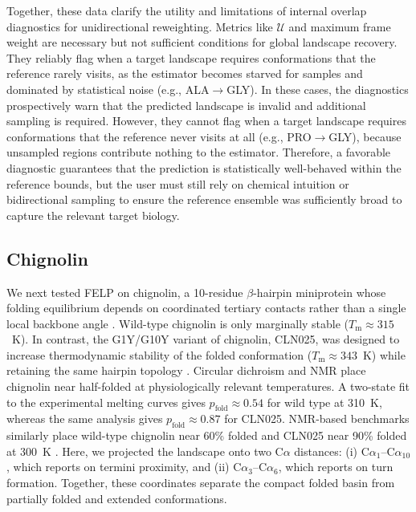 \documentclass[journal=jctcce,manuscript=article,layout=twocolumn,hyperref=true]{achemso}
\begin{document}
	Together, these data clarify the utility and limitations of internal overlap diagnostics for unidirectional reweighting. Metrics like $\mathcal{U}$ and maximum frame weight are necessary but not sufficient conditions for global landscape recovery. They reliably flag when a target landscape requires conformations that the reference rarely visits, as the estimator becomes starved for samples and dominated by statistical noise (e.g., ALA$\rightarrow$GLY). In these cases, the diagnostics prospectively warn that the predicted landscape is invalid and additional sampling is required. However, they cannot flag when a target landscape requires conformations that the reference never visits at all (e.g., PRO$\rightarrow$GLY), because unsampled regions contribute nothing to the estimator. Therefore, a favorable diagnostic guarantees that the prediction is statistically well-behaved within the reference bounds, but the user must still rely on chemical intuition or bidirectional sampling to ensure the reference ensemble was sufficiently broad to capture the relevant target biology. 
	
	\subsection{Chignolin}
	
	We next tested FELP on chignolin, a 10-residue $\beta$-hairpin miniprotein whose folding equilibrium depends on coordinated tertiary contacts rather than a single local backbone angle \cite{honda2004structure}. Wild-type chignolin is only marginally stable ($T_{\mathrm{m}}\approx315$~K). In contrast, the G1Y/G10Y variant of chignolin, CLN025, was designed to increase thermodynamic stability of the folded conformation ($T_{\mathrm{m}}\approx343$~K) while retaining the same hairpin topology \cite{honda2008jacs}. Circular dichroism and NMR place chignolin near half-folded at physiologically relevant temperatures. A two-state fit to the experimental melting curves gives $p_{\mathrm{fold}}\approx0.54$ for wild type at 310~K, whereas the same analysis gives $p_{\mathrm{fold}}\approx0.87$ for CLN025. NMR-based benchmarks similarly place wild-type chignolin near 60\% folded and CLN025 near 90\% folded at 300~K \cite{honda2004structure,honda2008jacs,fischer2024jctc}. Here, we projected the landscape onto two C$\alpha$ distances: (i) C$\alpha_1$--C$\alpha_{10}$, which reports on termini proximity, and (ii) C$\alpha_3$--C$\alpha_6$, which reports on turn formation. Together, these coordinates separate the compact folded basin from partially folded and extended conformations.
	
\end{document}

